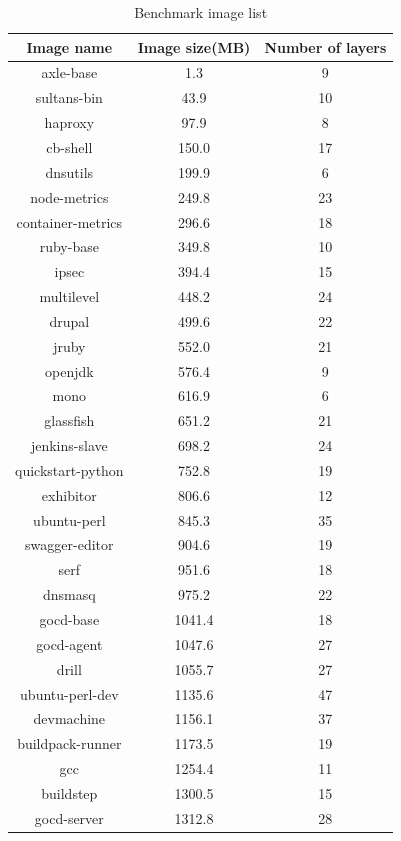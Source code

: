 \documentclass{ieicej}
\begin{document}
\begin{table}
	\begin{tabular}{| c | c | c |}
\hline
Image name & Image size(MB) & Number of layers \\
\hline
axle-base & 1.3 & 9 \\
\hline
sultans-bin & 43.9 & 10 \\
\hline
haproxy & 97.9 & 8 \\
\hline
cb-shell & 150.0 & 17 \\
\hline
dnsutils & 199.9 & 6 \\
\hline
node-metrics & 249.8 & 23 \\
\hline
container-metrics & 296.6 & 18 \\
\hline
ruby-base & 349.8 & 10 \\
\hline
ipsec & 394.4 & 15 \\
\hline
multilevel & 448.2 & 24 \\
\hline
drupal & 499.6 & 22 \\
\hline
jruby & 552.0 & 21 \\
\hline
openjdk & 576.4 & 9 \\
\hline
mono & 616.9 & 6 \\
\hline
glassfish & 651.2 & 21 \\
\hline
jenkins-slave & 698.2 & 24 \\
\hline
quickstart-python & 752.8 & 19 \\
\hline
exhibitor & 806.6 & 12 \\
\hline
ubuntu-perl & 845.3 & 35 \\
\hline
swagger-editor & 904.6 & 19 \\
\hline
serf & 951.6 & 18 \\
\hline
dnsmasq & 975.2 & 22 \\
\hline
gocd-base & 1041.4 & 18 \\
\hline
gocd-agent & 1047.6 & 27 \\
\hline
drill & 1055.7 & 27 \\
\hline
ubuntu-perl-dev & 1135.6 & 47 \\
\hline
devmachine & 1156.1 & 37 \\
\hline
buildpack-runner & 1173.5 & 19 \\
\hline
gcc & 1254.4 & 11 \\
\hline
buildstep & 1300.5 & 15 \\
\hline
gocd-server & 1312.8 & 28 \\
\hline
	\end{tabular}
	\caption{Benchmark image list}
  \label{bench_img_l}
\end{table}
\end{document}
